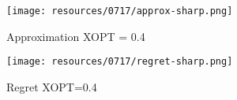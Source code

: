 \begin{itemize}
	\begin{figure}[h]
		\centering
		\texttt{[image: resources/0717/approx-sharp.png]}
		\caption{Approximation XOPT = 0.4}
		\label{approx-sharp}
		\end{figure}
		
	\begin{figure}[h]
		\centering
		\texttt{[image: resources/0717/regret-sharp.png]}
		\caption{Regret XOPT=0.4}
		\label{regret-sharp}
		\end{figure}


\end{itemize}



